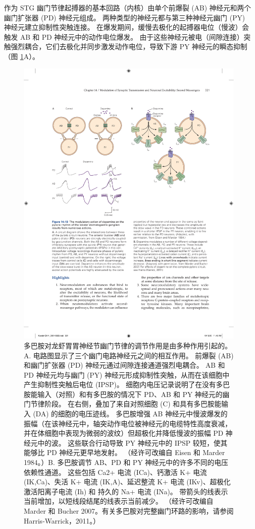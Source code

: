 作为 STG 幽门节律起搏器的基本回路（内核）由单个前爆裂 (AB) 神经元和两个幽门扩张器 (PD) 神经元组成。 
两种类型的神经元都与第三种神经元幽门 (PY) 神经元建立抑制性突触连接。 
在爆发期间，缓慢去极化的起搏器电位（慢波）会触发 AB 和 PD 神经元中的动作电位爆发。 
由于这些神经元被电（间隙连接）突触强烈耦合，它们去极化并同步激发动作电位，导致下游 PY 神经元的瞬态抑制（图 \ref{fig:14_13}A）。

\begin{figure}[htbp]
	\centering
	\includegraphics[width=0.95\linewidth]{chap14/fig_14_13}
	\caption{多巴胺对龙虾胃胃神经节幽门节律的调节作用是由多种作用引起的。 A. 电路图显示了三个幽门电路神经元之间的相互作用。 前爆裂 (AB) 和幽门扩张器 (PD) 神经元通过间隙连接通道强烈电耦合。 AB 和 PD 神经元均与幽门 (PY) 神经元形成抑制性突触，从而在该细胞中产生抑制性突触后电位 (IPSP)。 细胞内电压记录说明了在没有多巴胺能输入（对照）和有多巴胺的情况下 PD、AB 和 PY 神经元的幽门节律阶段。 在右侧，叠加了来自对照细胞 (C) 和具有多巴胺能输入 (DA) 的细胞的电压迹线。 多巴胺增强 AB 神经元中慢波爆发的振幅（在该神经元中，轴突动作电位被神经元的电缆特性高度衰减，并在体细胞中表现为微弱的波纹）但超极化并降低慢波的振幅 PD 神经元中的波。 这些联合行动导致 PY 神经元中的 IPSP 较短，使其能够比 PD 神经元更早地发射。 （经许可改编自 Eisen 和 Marder 1984。）B. 多巴胺调节 AB、PD 和 PY 神经元中的许多不同的电压依赖性通道。 这些包括 Ca2+ 电流 (ICa)、钙激活 K+ 电流 (IK,Ca)、失活 K+ 电流 (IK,A)、延迟整流 K+ 电流 (IKv)、超极化激活阳离子电流 (Ih) 和 持久的 Na+ 电流 (INa)。 带箭头的线表示当前增加，以短线段结尾的线表示当前减少。 （经许可改编自 Marder 和 Bucher 2007。有关多巴胺对完整幽门环路的影响，请参阅 Harris-Warrick，2011。）}
	\label{fig:14_13}
\end{figure}


